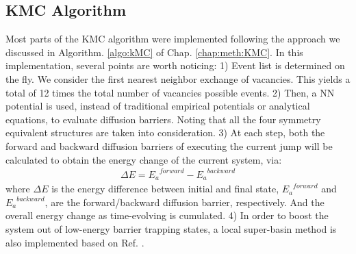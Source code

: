\subsection{\acf{KMC} Algorithm}
Most parts of the \ac{KMC} algorithm were implemented following the approach we discussed in Algorithm. \ref{algo:kMC} of Chap. \ref{chap:meth:KMC}. In this implementation, several points are worth noticing: 1) Event list is determined on the fly. We consider the first nearest neighbor exchange of vacancies. This yields a total of 12 times the total number of vacancies possible events. 2) Then, a \ac{NN} potential is used, instead of traditional empirical potentials or analytical equations, to evaluate diffusion barriers. Noting that all the four symmetry equivalent structures are taken into consideration. 3) At each step, both the forward and backward diffusion barriers of executing the current jump will be calculated to obtain the energy change of the current system, via:
\begin{align}
\Delta E = {E_a}^{forward} - {E_a}^{backward}
\label{Chap:Al/Vac:eq:barrier-EDiff}
\end{align}
where $\Delta E$ is the energy difference between initial and final state, ${E_a}^{forward}$ and ${E_a}^{backward}$, are the forward/backward diffusion barrier, respectively. And the overall energy change as time-evolving is cumulated. 4) In order to boost the system out of low-energy barrier trapping states, a local super-basin method is also implemented based on Ref. \cite{fichthorn2013local}.


